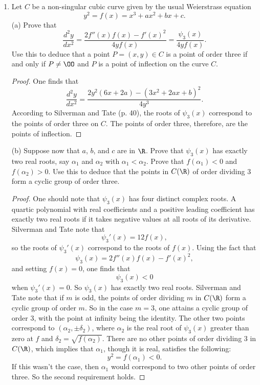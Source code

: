 \documentclass[11pt, oneside]{article}
\begin{document}
\begin{enumerate}
%
\item Let $C$ be a non-singular cubic curve given by the usual Weierstrass equation
$$
y^2 = f(x) = x^3 +ax^2+bx+c.
$$
(a) Prove that
$$
\frac{d^2y}{dx^2} = \frac{2f''(x)f(x) - f'(x)^2}{4yf(x)} = \frac{\psi_3(x)}{4yf(x)}.
$$
Use this to deduce that a point $P = (x,y)\in C$ is a point of order three if and only if $P\neq\OO$ and $P$ is a point of inflection on the curve $C$.
\begin{proof}
One finds that
$$
\frac{d^2y}{dx^2} = \frac{2y^2(6x+2a) -(3x^2+2ax+b)^2}{4y^3}.
$$
According to Silverman and Tate (p. 40), the roots of $\psi_3(x)$ correspond to the points of order three on $C$. The points of order three, therefore, are the points of inflection.
\end{proof}
(b) Suppose now that $a$, $b$, and $c$ are in $\R$. Prove that $\psi_3(x)$ has exactly two real roots, say $\alpha_1$ and $\alpha_2$ with $\alpha_1<\alpha_2$. Prove that $f(\alpha_1)<0$ and $f(\alpha_2)>0$. Use this to deduce that the points in $C(\R)$ of order dividing $3$ form a cyclic group of order three.
\begin{proof}
One should note that $\psi_3(x)$ has four distinct complex roots. A quartic polynomial with real coefficients and a positive leading coefficient has exactly two real roots if it takes negative values at all roots of its derivative. Silverman and Tate note that
$$
\psi_3' (x) = 12f(x),
$$
so the roots of $\psi_3' (x)$ correspond to the roots of $f(x)$. Using the fact that 
$$
\psi_3(x) = 2f''(x)f(x) - f'(x)^2,
$$
and setting $f(x)=0$, one finds that 
$$
\psi_3(x) < 0
$$
when $\psi_3'(x)=0$. So $\psi_3(x)$ has exactly two real roots. Silverman and Tate note that if $m$ is odd, the points of order dividing $m$ in $C(\R)$ form a cyclic group of order $m$. So in the case $m=3$, one attains a cyclic group of order $3$, with the point at infinity being the identity. The other two points correspond to $(\alpha_2, \pm \delta_2)$, where $\alpha_2$ is the real root of $\psi_3(x)$ greater than zero at $f$ and $\delta_2 =\sqrt{f(\alpha_2)}$. There are no other points of order dividing $3$ in $C(\R)$, which implies that $\alpha_1$, though it is real, satisfies the following:
$$
y^2 = f(\alpha_1) < 0.
$$
If this wasn't the case, then $\alpha_1$ would correspond to two other points of order three. So the second requirement holds. 
\end{proof}

\end{enumerate}
\end{document}
